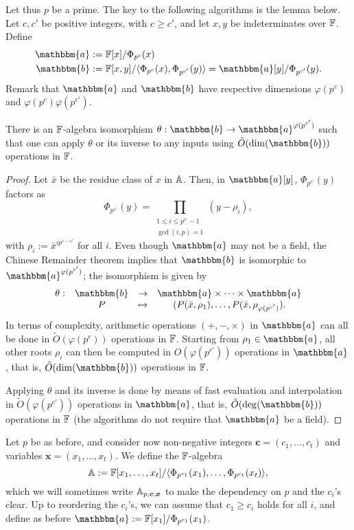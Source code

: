 Let thus $p$ be a prime. The key to the following algorithms is the
lemma below.  Let $c,c'$ be positive integers, with $c \ge
c'$, and let $x,y$ be indeterminates over $\mathbb{F}$. Define
\begin{align}
\mathbbm{a}&:=\F[x]/\Phi_{p^c}(x)  \\
\mathbbm{b}&:=\F[x,y]/\langle \Phi_{p^c}(x), \Phi_{p^{c'}}(y)\rangle = \mathbbm{a}[y]/\Phi_{p^{c'}}(y).
\end{align}
Remark that $\mathbbm{a}$ and $\mathbbm{b}$ have respective dimensions
$\varphi(p^c)$ and $\varphi(p^c) \varphi(p^{c'})$.
\begin{lemma}
  There is an $\mathbb{F}$-algebra isomorphism $\theta: \mathbbm{b} \to
  \mathbbm{a}^{\varphi(p^{c'})}$ such that one can apply $\theta$ or
  its inverse to any inputs using $\tilde{O}(\dim(\mathbbm{b}))$ operations in $\mathbb{F}$.
\end{lemma}
\begin{proof}
  Let $\bar x$ be the residue class of
  $x$ in $\mathbb{A}$. Then, in $\mathbbm{a}[y]$, $\Phi_{p^{c'}}(y)$ factors as
  $$\Phi_{p^{c'}}(y) =\prod_{\substack{1 \le i\le p^{c'}-1\\ \gcd(i,p)
      =1}} (y-\rho_i),$$ with $\rho_i:={\bar x}^{i p^{c-c'}}$ for all
  $i$.  Even though $\mathbbm{a}$ may not be a field, the Chinese
  Remainder theorem implies that $\mathbbm{b}$ is isomorphic to
  $\mathbbm{a}^{\varphi(p^{c'})}$; the isomorphism is given by
  $$\begin{array}{cccc}
    \theta: & \mathbbm{b} & \to & \mathbbm{a} \times \cdots \times \mathbbm{a} \\
    & P & \mapsto& (P(\bar x,\rho_1),\dots,P(\bar x,\rho_{\varphi(p^{c'})}).
  \end{array}$$
  In terms of complexity, arithmetic operations $(+,-,\times)$ in
  $\mathbbm{a}$ can all be done in $\tilde{O}(\varphi(p^c))$ operations
  in $\mathbb{F}$. Starting from $\rho_1 \in \mathbbm{a}$, all other roots
  $\rho_i$ can then be computed in $O(\varphi(p^{c'}))$ operations in
  $\mathbbm{a}$, that is, $\tilde{O}(\dim(\mathbbm{b}))$
  operations in $\mathbb{F}$. 
  
Applying $\theta$ and its inverse is done by means of fast evaluation
and interpolation~\cite[Chapter~10]{vzGathen13} in $\tilde{O}(\varphi(p^{c'}))$
operations in $\mathbbm{a}$, that is, $\tilde{O}(\deg(\mathbbm{b}))$ operations in $\mathbb{F}$
(the algorithms do not require that $\mathbbm{a}$ be a field).
\end{proof}

\smallskip{}
Let $p$ be as before, and consider now non-negative integers
$\boldsymbol{c}=(c_1,\dots,c_t)$ and variables $\boldsymbol{x}=(x_1,\dots,x_t)$. We
define the $\mathbb{F}$-algebra
$$\mathbb{A}:=\mathbb{F}[x_1,\dots,x_t]/\langle \Phi_{p^{c_1}}(x_1), \dots,
\Phi_{p^{c_t}}(x_t)\rangle,$$ which we will sometimes write
$\mathbb{A}_{p,\boldsymbol{c},\boldsymbol{x}}$ to make the dependency on $p$
and the $c_i$'s clear. Up to reordering the $c_i$'s, we can assume
that $c_1 \ge c_i$ holds for all $i$, and define as before
$\mathbbm{a}:=\F[x_1]/\Phi_{p^{c_1}}(x_1)$.

